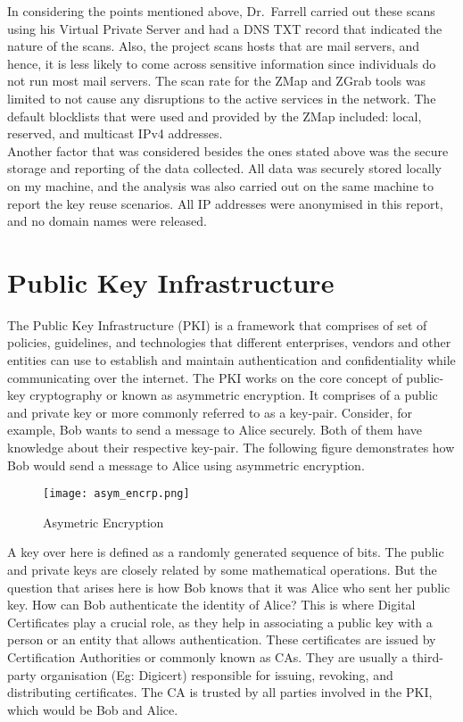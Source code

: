 \noindent In considering the points mentioned above, Dr.~Farrell carried out these scans using his Virtual Private Server and had a DNS TXT record 
that indicated the nature of the scans. Also, the project scans hosts that are mail servers, and hence, it is less likely to come across 
sensitive information since individuals do not run most mail servers. The scan rate for the ZMap and ZGrab tools was limited to not cause any 
disruptions to the active services in the network. The default blocklists that were used and provided by the ZMap included: local, reserved, and multicast IPv4 addresses.\\
Another factor that was considered besides the ones stated above was the secure storage and reporting of the data collected. All data 
was securely stored locally on my machine, and the analysis was also carried out on the same machine to report the key reuse scenarios. 
All IP addresses were anonymised in this report, and no domain names were released.

\section{Public Key Infrastructure} 
The Public Key Infrastructure (PKI) is a framework that comprises of set of policies, guidelines, and technologies that different enterprises, 
vendors and other entities can use to establish and maintain authentication and confidentiality while communicating over the internet. 
The PKI works on the core concept of public-key cryptography or known as asymmetric encryption. It comprises of a public and private key 
or more commonly referred to as a key-pair. 
Consider, for example, Bob wants to send a message to Alice securely. Both of them have knowledge about their respective key-pair. The following 
figure demonstrates how Bob would send a message to Alice using asymmetric encryption. 

\begin{figure}[h!]
    \centering
    \texttt{[image: asym\_encrp.png]}
    \caption{Asymetric Encryption}
\end{figure}

\noindent A key over here is defined as a randomly generated sequence of bits. The public and private keys are closely related by 
some mathematical operations. But the question that arises here is how Bob knows that it was Alice who sent her public key. 
How can Bob authenticate the identity of Alice? This is where Digital Certificates play a crucial role, as they help in associating a public key 
with a person or an entity that allows authentication. These certificates are issued by Certification Authorities or commonly known as CAs. They are usually a third-party 
organisation (Eg: Digicert) responsible for issuing, revoking, and distributing certificates. The CA is trusted by all parties involved in 
the PKI, which would be Bob and Alice.

